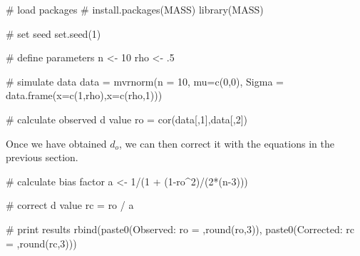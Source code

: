 \documentclass[
  letterpaper,
  DIV=11,
  numbers=noendperiod]{scrreprt}
\newenvironment{Shaded}{\begin{snugshade}}{\end{snugshade}}
\newcommand{\AttributeTok}[1]{\textcolor[rgb]{0.40,0.45,0.13}{#1}}
\newcommand{\CommentTok}[1]{\textcolor[rgb]{0.37,0.37,0.37}{#1}}
\newcommand{\DecValTok}[1]{\textcolor[rgb]{0.68,0.00,0.00}{#1}}
\newcommand{\FunctionTok}[1]{\textcolor[rgb]{0.28,0.35,0.67}{#1}}
\newcommand{\NormalTok}[1]{\textcolor[rgb]{0.00,0.23,0.31}{#1}}
\newcommand{\OtherTok}[1]{\textcolor[rgb]{0.00,0.23,0.31}{#1}}
\newcommand{\SpecialCharTok}[1]{\textcolor[rgb]{0.37,0.37,0.37}{#1}}
\newcommand{\StringTok}[1]{\textcolor[rgb]{0.13,0.47,0.30}{#1}}
\begin{document}
\begin{Shaded}
\begin{Highlighting}[]
\CommentTok{\# load packages}
\CommentTok{\# install.packages(\textquotesingle{}MASS\textquotesingle{})}
\FunctionTok{library}\NormalTok{(MASS)}

\CommentTok{\# set seed}
\FunctionTok{set.seed}\NormalTok{(}\DecValTok{1}\NormalTok{)}

\CommentTok{\# define parameters}
\NormalTok{n }\OtherTok{\textless{}{-}} \DecValTok{10}
\NormalTok{rho }\OtherTok{\textless{}{-}}\NormalTok{ .}\DecValTok{5}

\CommentTok{\# simulate data}
\NormalTok{data }\OtherTok{=} \FunctionTok{mvrnorm}\NormalTok{(}\AttributeTok{n =} \DecValTok{10}\NormalTok{,}
               \AttributeTok{mu=}\FunctionTok{c}\NormalTok{(}\DecValTok{0}\NormalTok{,}\DecValTok{0}\NormalTok{),}
               \AttributeTok{Sigma =} \FunctionTok{data.frame}\NormalTok{(}\AttributeTok{x=}\FunctionTok{c}\NormalTok{(}\DecValTok{1}\NormalTok{,rho),}\AttributeTok{x=}\FunctionTok{c}\NormalTok{(rho,}\DecValTok{1}\NormalTok{)))}

\CommentTok{\# calculate observed d value}
\NormalTok{ro }\OtherTok{=} \FunctionTok{cor}\NormalTok{(data[,}\DecValTok{1}\NormalTok{],data[,}\DecValTok{2}\NormalTok{])}
\end{Highlighting}
\end{Shaded}

Once we have obtained \(d_o\), we can then correct it with the equations
in the previous section.

\begin{Shaded}
\begin{Highlighting}[]
\CommentTok{\# calculate bias factor}
\NormalTok{a }\OtherTok{\textless{}{-}} \DecValTok{1}\SpecialCharTok{/}\NormalTok{(}\DecValTok{1} \SpecialCharTok{+}\NormalTok{ (}\DecValTok{1}\SpecialCharTok{{-}}\NormalTok{ro}\SpecialCharTok{\^{}}\DecValTok{2}\NormalTok{)}\SpecialCharTok{/}\NormalTok{(}\DecValTok{2}\SpecialCharTok{*}\NormalTok{(n}\DecValTok{{-}3}\NormalTok{)))}

\CommentTok{\# correct d value}
\NormalTok{rc }\OtherTok{=}\NormalTok{ ro }\SpecialCharTok{/}\NormalTok{ a}

\CommentTok{\# print results}
\FunctionTok{rbind}\NormalTok{(}\FunctionTok{paste0}\NormalTok{(}\StringTok{\textquotesingle{}Observed: ro = \textquotesingle{}}\NormalTok{,}\FunctionTok{round}\NormalTok{(ro,}\DecValTok{3}\NormalTok{)),}
      \FunctionTok{paste0}\NormalTok{(}\StringTok{\textquotesingle{}Corrected: rc = \textquotesingle{}}\NormalTok{,}\FunctionTok{round}\NormalTok{(rc,}\DecValTok{3}\NormalTok{)))}
\end{Highlighting}
\end{Shaded}
\end{document}
